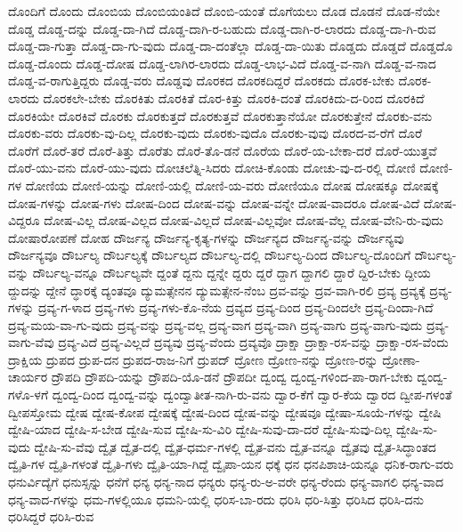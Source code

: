 {ದೊಂದಿಗೆ
ದೊಂದು
ದೊಂಬಿಯ
ದೊಂಬಿಯಂತಿದೆ
ದೊಂಬಿ-ಯಂತೆ
ದೊಗೆಯಲು
ದೊಡ
ದೊಡನೆ
ದೊಡ-ನೆಯೇ
ದೊಡ್ಡ
ದೊಡ್ಡ-ದನ್ನು
ದೊಡ್ಡ-ದಾ-ಗಿದೆ
ದೊಡ್ಡ-ದಾಗಿ-ರ-ಬಹುದು
ದೊಡ್ಡ-ದಾಗಿ-ರ-ಲಾರದು
ದೊಡ್ಡ-ದಾ-ಗಿ-ರುವ
ದೊಡ್ಡ-ದಾ-ಗುತ್ತಾ
ದೊಡ್ಡ-ದಾ-ಗು-ವುದು
ದೊಡ್ಡ-ದಾ-ದಂತೆಲ್ಲಾ
ದೊಡ್ಡ-ದಾ-ಯಿತು
ದೊಡ್ಡದು
ದೊಡ್ಡದೆ
ದೊಡ್ಡದೊ
ದೊಡ್ಡ-ದೊಂದು
ದೊಡ್ಡ-ದೋಷ
ದೊಡ್ಡ-ಲಾಗಿರ-ಲಾರದು
ದೊಡ್ಡ-ಲಾಭ-ವಿದೆ
ದೊಡ್ಡ-ವ-ನಾಗಿ
ದೊಡ್ಡ-ವ-ನಾದ
ದೊಡ್ಡ-ವ-ರಾಗುತ್ತಿದ್ದರು
ದೊಡ್ಡ-ವರು
ದೊಡ್ಡವು
ದೊರಕದ
ದೊರಕದಿದ್ದರೆ
ದೊರಕದು
ದೊರಕ-ಬೇಕು
ದೊರಕ-ಲಾರದು
ದೊರಕಲೇ-ಬೇಕು
ದೊರಕಿತು
ದೊರಕಿತೆ
ದೊರ-ಕಿತ್ತು
ದೊರಕಿ-ದಂತೆ
ದೊರಕಿದು-ದ-ರಿಂದ
ದೊರಕಿದೆ
ದೊರಕಿಯೇ
ದೊರಕಿವೆ
ದೊರಕು
ದೊರಕುತ್ತದೆ
ದೊರಕುತ್ತವೆ
ದೊರಕುತ್ತಾನೆಯೋ
ದೊರಕುತ್ತೇನೆ
ದೊರಕು-ವನು
ದೊರಕು-ವರು
ದೊರಕು-ವು-ದಿಲ್ಲ
ದೊರಕು-ವುದು
ದೊರಕು-ವುದೊ
ದೊರಕು-ವುವು
ದೊರದ-ವ-ರೆಗೆ
ದೊರೆ
ದೊರೆಗೆ
ದೊರೆ-ತರೆ
ದೊರೆ-ತಿತ್ತು
ದೊರೆತು
ದೊರೆ-ತೊ-ಡನೆ
ದೊರೆಯ
ದೊರೆ-ಯ-ಬೇಕಾ-ದರೆ
ದೊರೆ-ಯುತ್ತವೆ
ದೊರೆ-ಯು-ವನು
ದೊರೆ-ಯು-ವುದು
ದೋಚಲೆತ್ನಿ-ಸಿದರು
ದೋಚಿ-ಕೊಂಡು
ದೋಚು-ವು-ದ-ರಲ್ಲಿ
ದೋಣಿ
ದೋಣಿ-ಗಳ
ದೋಣಿಯ
ದೋಣಿ-ಯನ್ನು
ದೋಣಿ-ಯಲ್ಲಿ
ದೋಣಿ-ಯ-ವರು
ದೋಣಿಯೂ
ದೋಷ
ದೋಷಕ್ಕೂ
ದೋಷಕ್ಕೆ
ದೋಷ-ಗಳನ್ನು
ದೋಷ-ಗಳು
ದೋಷ-ದಿಂದ
ದೋಷ-ವನ್ನು
ದೋಷ-ವನ್ನೇ
ದೋಷ-ವಾದರೂ
ದೋಷ-ವಿದೆ
ದೋಷ-ವಿದ್ದರೂ
ದೋಷ-ವಿಲ್ಲ
ದೋಷ-ವಿಲ್ಲದ
ದೋಷ-ವಿಲ್ಲದೆ
ದೋಷ-ವಿಲ್ಲವೋ
ದೋಷ-ವೆಲ್ಲ
ದೋಷ-ವೇನಿ-ರು-ವುದು
ದೋಷಾರೋಪಣೆ
ದೋಹ
ದೌರ್ಜನ್ಯ
ದೌರ್ಜನ್ಯ-ಕೃತ್ಯ-ಗಳನ್ನು
ದೌರ್ಜನ್ಯದ
ದೌರ್ಜನ್ಯ-ವನ್ನು
ದೌರ್ಜನ್ಯವು
ದೌರ್ಜನ್ಯವೂ
ದೌರ್ಬಲ್ಯ
ದೌರ್ಬಲ್ಯಕ್ಕೆ
ದೌರ್ಬಲ್ಯದ
ದೌರ್ಬಲ್ಯ-ದಲ್ಲಿ
ದೌರ್ಬಲ್ಯ-ದಿಂದ
ದೌರ್ಬಲ್ಯ-ದೊಂದಿಗೆ
ದೌರ್ಬಲ್ಯ-ವನ್ನು
ದೌರ್ಬಲ್ಯ-ವನ್ನೂ
ದೌರ್ಬಲ್ಯವೇ
ದ್ದಂತೆ
ದ್ದನು
ದ್ದನ್ನೇ
ದ್ದರು
ದ್ದರೆ
ದ್ದಾಗ
ದ್ದಾಗಲಿ
ದ್ದಾರೆ
ದ್ದಿರ-ಬೇಕು
ದ್ದೀಯ
ದ್ದುದನ್ನು
ದ್ದೇನೆ
ದ್ಧಾರಕ್ಕೆ
ದ್ಯಂತವೂ
ದ್ಯುಮತ್ಸೇನನ
ದ್ಯುಮತ್ಸೇನ-ನೆಂಬ
ದ್ರವ-ವನ್ನು
ದ್ರವ-ವಾಗಿ-ರಲಿ
ದ್ರವ್ಯ
ದ್ರವ್ಯಕ್ಕೆ
ದ್ರವ್ಯ-ಗಳನ್ನು
ದ್ರವ್ಯ-ಗ-ಳಾದ
ದ್ರವ್ಯ-ಗಳು
ದ್ರವ್ಯ-ಗಳು-ಕೊ-ನೆಯ
ದ್ರವ್ಯದ
ದ್ರವ್ಯ-ದಿಂದ
ದ್ರವ್ಯ-ದಿಂದಲೇ
ದ್ರವ್ಯ-ದಿಂದಾ-ಗಿದೆ
ದ್ರವ್ಯ-ಮಯ-ವಾ-ಗು-ವುದು
ದ್ರವ್ಯ-ವನ್ನು
ದ್ರವ್ಯ-ವಲ್ಲ
ದ್ರವ್ಯ-ವಾಗ
ದ್ರವ್ಯ-ವಾಗಿ
ದ್ರವ್ಯ-ವಾಗು
ದ್ರವ್ಯ-ವಾಗು-ವುದು
ದ್ರವ್ಯ-ವಾಗು-ವೆವು
ದ್ರವ್ಯ-ವಿದೆ
ದ್ರವ್ಯ-ವಿಲ್ಲದೆ
ದ್ರವ್ಯವು
ದ್ರವ್ಯ-ವೆಂದು
ದ್ರವ್ಯವೊ
ದ್ರಾಕ್ಷಾ
ದ್ರಾಕ್ಷಾ-ರಸ-ವನ್ನು
ದ್ರಾಕ್ಷಾ-ರಸ-ವೆಂದು
ದ್ರಾಕ್ಷಿಯ
ದ್ರುಪದ
ದ್ರುಪ-ದನ
ದ್ರುಪದ-ರಾಜ-ನಿಗೆ
ದ್ರುಪದ್
ದ್ರೋಣ
ದ್ರೋಣ-ನನ್ನು
ದ್ರೋಣ-ರನ್ನು
ದ್ರೋಣಾ-ಚಾರ್ಯರ
ದ್ರೌಪದಿ
ದ್ರೌಪದಿ-ಯನ್ನು
ದ್ರೌಪದಿ-ಯೊ-ಡನೆ
ದ್ರೌಪದೀ
ದ್ವಂದ್ವ
ದ್ವಂದ್ವ-ಗಳಿಂದ-ಪಾ-ರಾಗ-ಬೇಕು
ದ್ವಂದ್ವ-ಗಳೊ-ಳಗೆ
ದ್ವಂದ್ವ-ದಿಂದ
ದ್ವಂದ್ವ-ವನ್ನು
ದ್ವಂದ್ವಾತೀತ-ನಾಗಿ-ರು-ವನು
ದ್ವಾರ-ಕೆಗೆ
ದ್ವಾರ-ಕೆಯ
ದ್ವಾರದ
ದ್ವೀಪ-ಗಳಂತೆ
ದ್ವೀಪಸ್ತೋಮ
ದ್ವೇಷ
ದ್ವೇಷ-ಕೋಪ
ದ್ವೇಷಕ್ಕೆ
ದ್ವೇಷ-ದಿಂದ
ದ್ವೇಷ-ವನ್ನು
ದ್ವೇಷವೂ
ದ್ವೇಷಾ-ಸೂಯೆ-ಗಳನ್ನು
ದ್ವೇಷಿ
ದ್ವೇಷಿ-ಯಾದ
ದ್ವೇಷಿ-ಸ-ಬೇಡ
ದ್ವೇಷಿ-ಸುವ
ದ್ವೇಷಿ-ಸು-ವಿರಿ
ದ್ವೇಷಿ-ಸುವು-ದಾ-ದರೆ
ದ್ವೇಷಿ-ಸುವು-ದಿಲ್ಲ
ದ್ವೇಷಿ-ಸು-ವುದು
ದ್ವೇಷಿ-ಸು-ವೆವು
ದ್ವೈತ
ದ್ವೈತ-ದಲ್ಲಿ
ದ್ವೈತ-ಧರ್ಮ-ಗಳಲ್ಲಿ
ದ್ವೈತ-ವನು
ದ್ವೈತ-ವನ್ನೂ
ದ್ವೈತವು
ದ್ವೈತ-ಸಿದ್ಧಾಂತದ
ದ್ವೈತಿ-ಗಳ
ದ್ವೈತಿ-ಗಳಂತೆ
ದ್ವೈತಿ-ಗಳು
ದ್ವೈತಿ-ಯಾ-ಗಿದ್ದೆ
ದ್ವೈಪಾ-ಯನ
ಧಕ್ಕೆ
ಧನ
ಧನಪಿಶಾಚಿ-ಯನ್ನೂ
ಧನಿಕ-ರಾಗು-ವರು
ಧನುರ್ವಿದ್ಯೆಗೆ
ಧನುಸ್ಸನ್ನು
ಧನೆಗೆ
ಧನ್ಯ
ಧನ್ಯ-ನಾದ
ಧನ್ಯರು
ಧನ್ಯ-ರು-ಅ-ವರೇ
ಧನ್ಯ-ರೆಂದು
ಧನ್ಯ-ವಾಗಲಿ
ಧನ್ಯ-ವಾದ
ಧನ್ಯ-ವಾದ-ಗಳನ್ನು
ಧಮ-ಗಳಲ್ಲಿಯೂ
ಧಮನಿ-ಯಲ್ಲಿ
ಧರಿಸ-ಬಾ-ರದು
ಧರಿಸಿ
ಧರಿ-ಸಿತ್ತು
ಧರಿಸಿದ
ಧರಿಸಿ-ದನು
ಧರಿಸಿದ್ದರೆ
ಧರಿಸಿ-ರುವ
}
